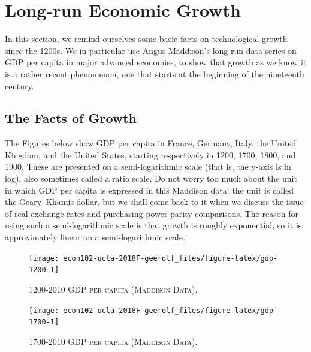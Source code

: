 \documentclass[]{book}
\theoremstyle{definition}
\theoremstyle{definition}
\theoremstyle{definition}
\theoremstyle{remark}
\begin{document}
\section{Long-run Economic Growth}\label{long-run-growth}

In this section, we remind ourselves some basic facts on technological
growth since the 1200s. We in particular use Angus Maddison's long run
data series on GDP per capita in major advanced economies, to show that
growth as we know it is a rather recent phenomenon, one that starts at
the beginning of the nineteenth century.

\subsection{The Facts of Growth}\label{the-facts-of-growth}

The Figures below show GDP per capita in France, Germany, Italy, the
United Kingdom, and the United States, starting respectively in 1200,
1700, 1800, and 1900. These are presented on a semi-logarithmic scale
(that is, the y-axis is in log), also sometimes called a ratio scale. Do
not worry too much about the unit in which GDP per capita is expressed
in this Maddison data: the unit is called the
\href{https://en.wikipedia.org/wiki/Geary\%E2\%80\%93Khamis_dollar}{Geary--Khamis
dollar}, but we shall come back to it when we discuss the issue of real
exchange rates and purchasing power parity comparisons. The reason for
using such a semi-logarithmic scale is that growth is roughly
exponential, so it is approximately linear on a semi-logarithmic scale.



\begin{figure}

{\centering \texttt{[image: econ102-ucla-2018F-geerolf\_files/figure-latex/gdp-1200-1]} 

}

\caption{\textsc{1200-2010 GDP per capita (Maddison Data)}.}\label{fig:gdp-1200}
\end{figure}



\begin{figure}

{\centering \texttt{[image: econ102-ucla-2018F-geerolf\_files/figure-latex/gdp-1700-1]} 

}

\caption{\textsc{1700-2010 GDP per capita (Maddison Data)}.}\label{fig:gdp-1700}
\end{figure}
\end{document}
